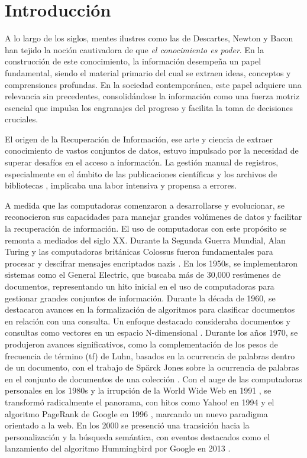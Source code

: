 \chapter*{Introducción}\label{chapter:introduction}

	A lo largo de los siglos, mentes ilustres como las de Descartes, Newton y Bacon han tejido la noción cautivadora de que \textit{el conocimiento es poder}. En la construcci\'on de este conocimiento, la información desempeña un papel fundamental, siendo el material primario del cual se extraen ideas, conceptos y comprensiones profundas. En la sociedad contemporánea, este papel adquiere una relevancia sin precedentes, consolidándose la información como una fuerza motriz esencial que impulsa los engranajes del progreso y facilita la toma de decisiones cruciales.

El origen de la Recuperación de Información, ese arte y ciencia de extraer conocimiento de vastos conjuntos de datos, estuvo impulsado por la necesidad de superar desafíos en el acceso a información. La gestión manual de registros, especialmente en el ámbito de las publicaciones científicas y los archivos de bibliotecas \cite{manning_introduction_2009}, implicaba una labor intensiva y propensa a errores.

A medida que las computadoras comenzaron a desarrollarse y evolucionar, se reconocieron sus capacidades para manejar grandes vol\'umenes de datos y facilitar la recuperación de información. El uso de computadoras con este prop\'osito se remonta a mediados del siglo XX. Durante la Segunda Guerra Mundial, Alan Turing y las computadoras británicas Colossus fueron fundamentales para procesar y descifrar mensajes encriptados nazis \cite{hodges_alan_2012}. En los 1950s, se implementaron sistemas como el General Electric, que buscaba más de 30,000 resúmenes de documentos, representando un hito inicial en el uso de computadoras para gestionar grandes conjuntos de información. \cite{sanderson_history_2012} Durante la década de 1960, se destacaron avances en la formalización de algoritmos para clasificar documentos en relación con una consulta. Un enfoque destacado consideraba documentos y consultas como vectores en un espacio N-dimensional \cite{sanderson_history_2012}. Durante los a\~nos 1970, se produjeron avances significativos, como la complementación de los pesos de frecuencia de término (tf) de Luhn, basados en la ocurrencia de palabras dentro de un documento, con el trabajo de Spärck Jones sobre la ocurrencia de palabras en el conjunto de documentos de una colección \cite{sanderson_history_2012}. Con el auge de las computadoras personales en los 1980s \cite{magazine} y la irrupción de la World Wide Web en 1991 \cite{sendall_world-wide_nodate}, se transformó radicalmente el panorama, con hitos como Yahoo! en 1994 \cite{freeman_yahoo_2008} y el algoritmo PageRank de Google en 1996 \cite{sanderson_history_2012}, marcando un nuevo paradigma orientado a la web. En los 2000 se presenció una transición hacia la personalización y la búsqueda semántica, con eventos destacados como el lanzamiento del algoritmo Hummingbird por Google en 2013 \cite{lin_how_2014}. 

